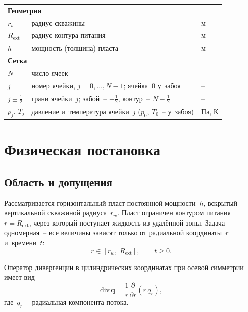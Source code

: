 \documentclass[12pt,a4paper]{article}
\newcommand{\half}{\tfrac{1}{2}}
\newcommand{\rw}{r_w}
\newcommand{\Rext}{R_{\mathrm{ext}}}
\newcommand{\divr}[1]{\frac{1}{r}\frac{\partial}{\partial r}\!\left(r\,#1\right)}
\begin{document}
\begin{longtable}{lll}
\multicolumn{3}{l}{\textbf{Геометрия}} \\
$\rw$         & радиус скважины                           & м \\
$\Rext$       & радиус контура питания                    & м \\
$h$           & мощность (толщина) пласта                  & м \\

\multicolumn{3}{l}{\textbf{Сетка}} \\
$N$           & число ячеек                                & --\\
$j$           & номер ячейки, $j = 0, \ldots, N-1$; ячейка~0 у~забоя & --\\
$j \pm \half$ & грани ячейки~$j$; забой~-- $-\half$, контур~-- $N-\half$ & --\\
$p_j$, $T_j$  & давление и~температура ячейки~$j$ ($p_0$, $T_0$~-- у~забоя) & Па, К \\

\end{longtable}


\section{Физическая постановка}\label{sec:formulation}

\subsection{Область и допущения}\label{ssec:domain}

Рассматривается горизонтальный пласт постоянной мощности~$h$, вскрытый
вертикальной скважиной радиуса~$\rw$. Пласт ограничен контуром
питания~$r = \Rext$, через который поступает жидкость из удалённой зоны.
Задача одномерная~-- все величины зависят только от радиальной
координаты~$r$ и~времени~$t$:
\begin{equation}\label{eq:domain}
  r \in [\rw,\; \Rext], \qquad t \geqslant 0.
\end{equation}

Оператор дивергенции в цилиндрических координатах при осевой
симметрии имеет вид
\begin{equation}\label{eq:div}
  \mathrm{div}\,\mathbf{q} = \divr{q_r},
\end{equation}
где~$q_r$~-- радиальная компонента потока.
\end{document}
